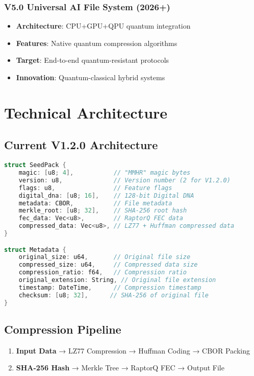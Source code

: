 \documentclass[12pt,a4paper]{article}
\begin{document}
\subsubsection{V5.0 Universal AI File System (2026+)}
\begin{itemize}
    \item \textbf{Architecture}: CPU+GPU+QPU quantum integration
    \item \textbf{Features}: Native quantum compression algorithms
    \item \textbf{Target}: End-to-end quantum-resistant protocols
    \item \textbf{Innovation}: Quantum-classical hybrid systems
\end{itemize}

\newpage

\section{Technical Architecture}

\subsection{Current V1.2.0 Architecture}
\begin{lstlisting}[language=C, caption=Core File Format Structure]
struct SeedPack {
    magic: [u8; 4],           // "MMHR" magic bytes
    version: u8,              // Version number (2 for V1.2.0)
    flags: u8,                // Feature flags
    digital_dna: [u8; 16],    // 128-bit Digital DNA
    metadata: CBOR,           // File metadata
    merkle_root: [u8; 32],    // SHA-256 root hash
    fec_data: Vec<u8>,        // RaptorQ FEC data
    compressed_data: Vec<u8>, // LZ77 + Huffman compressed data
}

struct Metadata {
    original_size: u64,       // Original file size
    compressed_size: u64,     // Compressed data size
    compression_ratio: f64,   // Compression ratio
    original_extension: String, // Original file extension
    timestamp: DateTime,      // Compression timestamp
    checksum: [u8; 32],      // SHA-256 of original file
}
\end{lstlisting}

\subsection{Compression Pipeline}
\begin{enumerate}
    \item \textbf{Input Data} → LZ77 Compression → Huffman Coding → CBOR Packing
    \item \textbf{SHA-256 Hash} → Merkle Tree → RaptorQ FEC → Output File
\end{enumerate}
\end{document}

